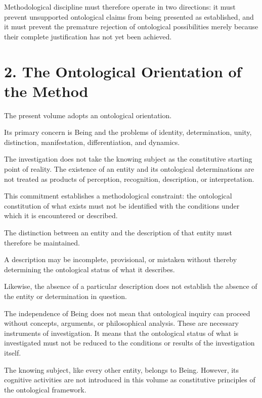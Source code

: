 Methodological discipline must therefore operate
in two directions: it must prevent unsupported
ontological claims from being presented as established,
and it must prevent the premature rejection of
ontological possibilities merely because their
complete justification has not yet been achieved.


\section*{2. The Ontological Orientation of the Method}

The present volume adopts an ontological orientation.

Its primary concern is Being and the problems
of identity, determination, unity, distinction,
manifestation, differentiation, and dynamics.

The investigation does not take the knowing subject
as the constitutive starting point of reality.
The existence of an entity and its ontological
determinations are not treated as products of
perception, recognition, description, or interpretation.

This commitment establishes a methodological
constraint: the ontological constitution of
what exists must not be identified with the
conditions under which it is encountered
or described.

The distinction between an entity and the
description of that entity must therefore
be maintained.

A description may be incomplete, provisional,
or mistaken without thereby determining
the ontological status of what it describes.

Likewise, the absence of a particular description
does not establish the absence of the entity
or determination in question.

The independence of Being does not mean that
ontological inquiry can proceed without concepts,
arguments, or philosophical analysis. These
are necessary instruments of investigation.
It means that the ontological status of what
is investigated must not be reduced to the
conditions or results of the investigation itself.

The knowing subject, like every other entity,
belongs to Being. However, its cognitive activities
are not introduced in this volume as constitutive
principles of the ontological framework.

